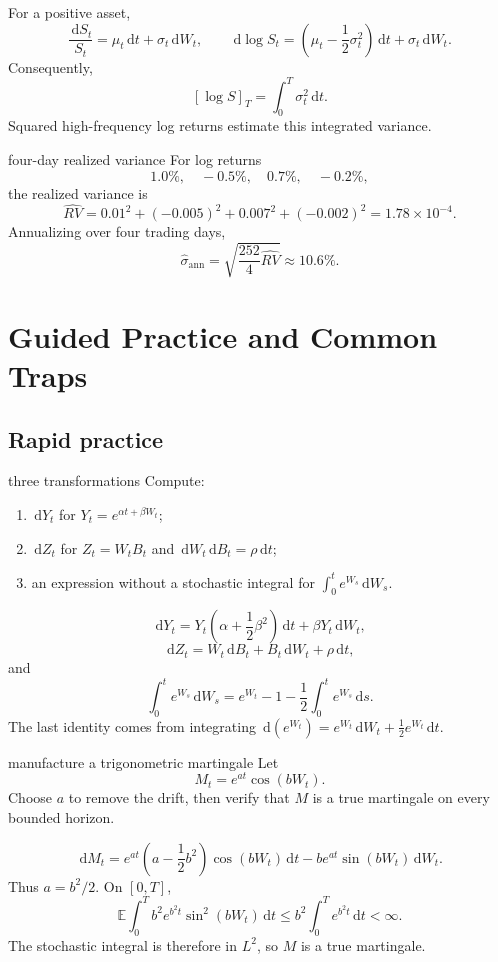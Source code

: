 \documentclass[10pt]{article}
\newcommand{\E}{\mathbb E}
\newcommand{\1}{\mathbf 1}
\newcommand{\dd}{\,\mathrm d}
\theoremstyle{definition}
\begin{document}
For a positive asset,
\[
\frac{\dd S_t}{S_t}
=\mu_t\dd t+\sigma_t\dd W_t,
\qquad
\dd\log S_t
=\left(\mu_t-\frac12\sigma_t^2\right)\dd t
+\sigma_t\dd W_t.
\]
Consequently,
\[
\boxed{
[\log S]_T=\int_0^T\sigma_t^2\dd t.}
\]
Squared high-frequency log returns estimate this integrated variance.

\begin{boardexample}{four-day realized variance}
For log returns
\[
1.0\%,\quad -0.5\%,\quad 0.7\%,\quad -0.2\%,
\]
the realized variance is
\[
\widehat{RV}
=0.01^2+(-0.005)^2+0.007^2+(-0.002)^2
=1.78\times10^{-4}.
\]
Annualizing over four trading days,
\[
\boxed{
\widehat\sigma_{\mathrm{ann}}
=\sqrt{\frac{252}{4}\widehat{RV}}
\approx10.6\%.}
\]
\end{boardexample}

\section{Guided Practice and Common Traps}

\subsection{Rapid practice}

\begin{studentexercise}{three transformations}
Compute:
\begin{enumerate}
  \item \(\dd Y_t\) for \(Y_t=e^{\alpha t+\beta W_t}\);
  \item \(\dd Z_t\) for \(Z_t=W_tB_t\) and
        \(\dd W_t\dd B_t=\rho\dd t\);
  \item an expression without a stochastic integral for
        \(\int_0^te^{W_s}\dd W_s\).
\end{enumerate}
\end{studentexercise}
\begin{shortsolution}
\[
\dd Y_t
=Y_t\left(\alpha+\frac12\beta^2\right)\dd t
+\beta Y_t\dd W_t,
\]
\[
\dd Z_t
=W_t\dd B_t+B_t\dd W_t+\rho\dd t,
\]
and
\[
\boxed{
\int_0^te^{W_s}\dd W_s
=e^{W_t}-1-\frac12\int_0^te^{W_s}\dd s.}
\]
The last identity comes from integrating
\(\dd(e^{W_t})=e^{W_t}\dd W_t+\tfrac12e^{W_t}\dd t\).
\end{shortsolution}

\begin{studentexercise}{manufacture a trigonometric martingale}
Let
\[
M_t=e^{at}\cos(bW_t).
\]
Choose \(a\) to remove the drift, then verify that \(M\) is a true
martingale on every bounded horizon.
\end{studentexercise}
\begin{shortsolution}
\[
\dd M_t
=e^{at}\left(a-\frac12b^2\right)\cos(bW_t)\dd t
-be^{at}\sin(bW_t)\dd W_t.
\]
Thus \(a=b^2/2\). On \([0,T]\),
\[
\E\int_0^Tb^2e^{b^2t}\sin^2(bW_t)\dd t
\leq b^2\int_0^Te^{b^2t}\dd t<\infty.
\]
The stochastic integral is therefore in \(L^2\), so \(M\) is a true
martingale.
\end{shortsolution}
\end{document}
